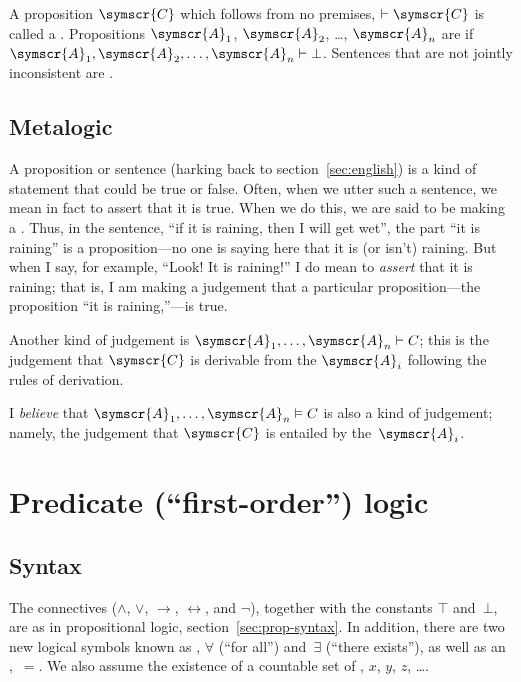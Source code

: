 \documentclass{article}
\newcommand{\wff}[1]{\ensuremath{\symscr{#1}}} %
\newcommand{\var}[1]{\mathit{#1}} %
\begin{document}
A proposition $\wff{C}$ which follows from no premises, $\vdash\wff{C}$ is
called a .  Propositions $\wff{A}_1$, $\wff{A}_2$, \dots,
$\wff{A}_n$ are  if $\wff{A}_1, \wff{A}_2, \dots, \wff{A}_n \vdash \bot$.
Sentences that are not jointly inconsistent are .

\subsection{Metalogic}
A proposition or sentence (harking back to section~\ref{sec:english}) is
a kind of statement that could be true or false.  Often, when we utter
such a sentence, we mean in fact to assert that it is true.  When we do
this, we are said to be making a .  Thus, in the sentence, ``if it
is raining, then I will get wet'', the part ``it is raining'' is a
proposition---no one is saying here that it is (or isn't) raining. But
when I say, for example, ``Look!  It is raining!'' I do mean to
\emph{assert} that it is raining; that is, I am making a judgement that
a particular proposition---the proposition ``it is raining,''---is true.

Another kind of judgement is $\wff{A}_1, \dots,\wff{A}_n \vdash C$; this is the judgement that $\wff{C}$ is derivable from the $\wff{A}_i$ following the rules of derivation.

I \emph{believe} that $\wff{A}_1, \dots,\wff{A}_n \vDash C$ is also a kind of
judgement; namely, the judgement that $\wff{C}$ is entailed by the~$\wff{A}_i$. 


\section{Predicate (``first-order'') logic}

\subsection{Syntax}
  The connectives ($\wedge$, $\vee$, $\to$,
$\leftrightarrow$, and $\neg$), together with the constants $\top$
and~$\bot$, are as in propositional logic,
section~\ref{sec:prop-syntax}. In addition, there are two new logical
symbols known as , $\forall$ (``for all'') and~$\exists$ (``there exists''), as
well as an ,~$=$. We also assume the existence of
a countable set of , $\var{x}$, $\var{y}$, $\var{z}$,
\dots.
\end{document}
